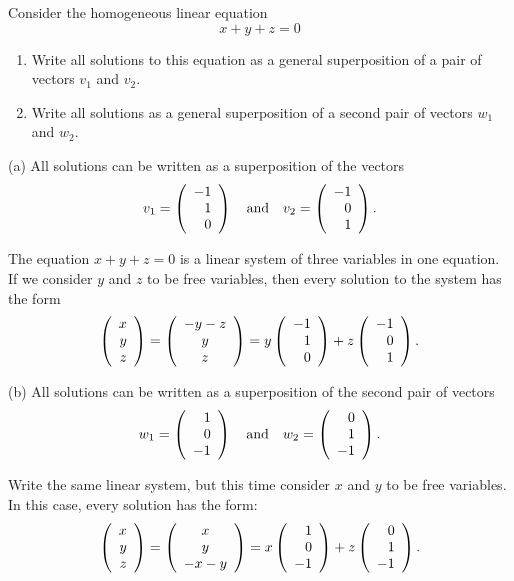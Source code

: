 \documentclass{ximera}
\begin{document}
\EXER

\TEXER

\begin{exercise} \label{c4.4.1}
Consider the homogeneous linear equation
\[
x+y+z = 0
\]
\begin{enumerate}
\item[(a)]  Write all solutions to this equation as a general
superposition of a pair of vectors $v_1$ and $v_2$.
\item[(b)]  Write all solutions as a general superposition of
a second pair of vectors $w_1$ and $w_2$.
\end{enumerate}

\begin{solution}

(a) \ans All solutions can be written as a superposition of the vectors
\[
v_1 = \left(\begin{array}{r} -1 \\ 1 \\ 0\end{array}\right) \quad\mbox{and}\quad v_2 = \left(\begin{array}{r} -1 \\ 0 \\ 1\end{array}\right).
\]

\soln The equation $x + y + z = 0$ is a linear system of three variables
in one equation.  If we consider $y$ and $z$ to be free variables, then
every solution to the system has the form
\[
\left(\begin{array}{r} x \\ y \\ z\end{array}\right) = \left(\begin{array}{c} -y - z \\ y \\
z \end{array}\right) = y\left(\begin{array}{r} -1 \\ 1 \\ 0\end{array}\right) +
z\left(\begin{array}{r} -1 \\ 0 \\ 1\end{array}\right).
\]

(b) \ans All solutions can be written as a superposition
of the second pair of vectors
\[
w_1 = \left(\begin{array}{r} 1 \\ 0 \\ -1\end{array}\right) \quad\mbox{and}\quad w_2 = \left(\begin{array}{r} 0 \\ 1 \\ -1\end{array}\right).
\]

\soln Write the same linear system, but this time consider $x$ and $y$
to be free variables.  In this case, every solution has the form:
\[
\left(\begin{array}{r} x \\ y \\ z\end{array}\right) = \left(\begin{array}{c} x \\ y \\
-x - y \end{array}\right) = x\left(\begin{array}{r} 1 \\ 0 \\ -1\end{array}\right) +
z\left(\begin{array}{r} 0 \\ 1 \\ -1\end{array}\right).
\]

\end{solution}
\end{exercise}
\end{document}
